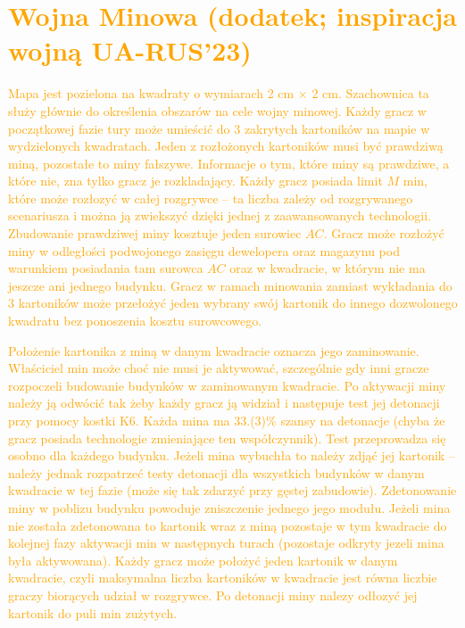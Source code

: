 \documentclass[11pt,a4paper]{article}
\begin{document}
\section{\textcolor{orange}{Wojna Minowa (dodatek; inspiracja wojną UA-RUS'23)}}

\textcolor{orange}{Mapa jest pozielona na kwadraty o wymiarach 2 cm $\times$ 2 cm. Szachownica ta służy głównie do określenia obszarów na cele wojny minowej. Każdy gracz w początkowej fazie tury może umieścić do 3 zakrytych kartoników na mapie w wydzielonych kwadratach. Jeden z rozłożonych kartoników musi być prawdziwą miną, pozostałe to miny fałszywe. Informacje o tym, które miny są prawdziwe, a które nie, zna tylko gracz je rozkladający. Każdy gracz posiada limit $M$ min, które może rozłozyć w całej rozgrywce -- ta liczba zależy od rozgrywanego scenariusza i można ją zwiekszyć dzięki jednej z zaawansowanych technologii. Zbudowanie prawdziwej miny kosztuje jeden surowiec $AC$. Gracz może rozłożyć miny w odległości podwojonego zasięgu dewelopera oraz magazynu pod warunkiem posiadania tam surowca $AC$ oraz w kwadracie, w którym nie ma jeszcze ani jednego budynku. Gracz w ramach minowania zamiast wykładania do 3 kartoników może przełożyć jeden wybrany swój kartonik do innego dozwolonego kwadratu bez ponoszenia kosztu surowcowego.}

\textcolor{orange}{Położenie kartonika z miną w danym kwadracie oznacza jego zaminowanie. Właściciel min może choć nie musi je aktywować, szczególnie gdy inni gracze rozpoczeli budowanie budynków w zaminowanym kwadracie. Po aktywacji miny należy ją odwócić tak żeby każdy gracz ją widział i następuje test jej detonacji przy pomocy kostki K6. Każda mina ma 33.(3)\% szansy na detonacje (chyba że gracz posiada technologie zmieniające ten współczynnik). Test przeprowadza się osobno dla każdego budynku. Jeżeli mina wybuchła to należy zdjąć jej kartonik -- należy jednak rozpatrzeć testy detonacji dla wszystkich budynków w danym kwadracie w tej fazie (może się tak zdarzyć przy gęstej zabudowie). Zdetonowanie miny w poblizu budynku powoduje zniszczenie jednego jego modułu. Jeżeli mina nie została zdetonowana to kartonik  wraz z miną pozostaje w tym kwadracie do kolejnej fazy aktywacji min w następnych turach (pozostaje odkryty jezeli mina była aktywowana). Każdy gracz może położyć jeden kartonik w danym kwadracie, czyli maksymalna liczba kartoników w kwadracie jest równa liczbie graczy biorących udział w rozgrywce.  Po detonacji miny nalezy odłozyć jej kartonik do puli min zużytych.}
\end{document}
